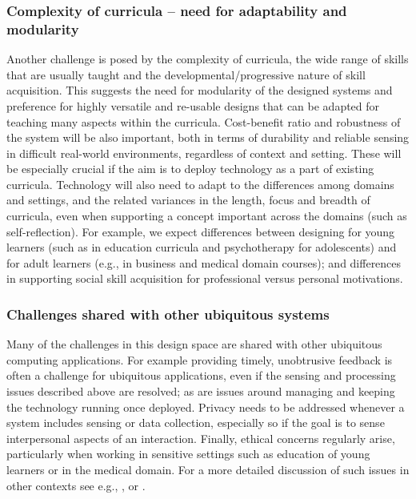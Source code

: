 \documentclass[prodmode,acmtochi]{acmsmall}
\newcommand{\GeraldineTODO}[1]{}
\newcommand{\rephrase}[1]{\textrm{\textrm{\textcolor{gray}{#1}}}}
\begin{document}
\subsubsection{Complexity of curricula -- need for adaptability and modularity}
Another challenge is posed by the complexity of curricula, the wide range of skills that are usually taught and the developmental/progressive nature of skill acquisition. This suggests the need for modularity of the designed systems and preference for highly versatile and re-usable designs that can be adapted for teaching many aspects within the curricula. %
%
%
Cost-benefit ratio and robustness of the system will be also important, both in terms of durability and reliable sensing in difficult real-world environments, regardless of context and setting. These will be especially crucial if the aim is to deploy technology as a part of existing curricula. 
%
Technology will also need to adapt to the differences among domains and settings, and the related variances in the length, focus and breadth of curricula, even when supporting a concept important across the domains (such as self-reflection). For example, we expect differences between designing for young learners (such as in education curricula and psychotherapy for adolescents) and for adult learners (e.g., in business and medical domain courses); and differences in supporting social skill acquisition for professional versus personal motivations.

\GeraldineTODO{G: could reference here something from the PAL\ project   and their AIRS platform and/or the MyRoR platform as technical architectures specifically aiming to support such adaptive modularity    }

\subsubsection{Challenges shared with other ubiquitous systems} Many of the challenges in this design space are shared with other ubiquitous computing applications. For example  providing timely, unobtrusive feedback is often a challenge for ubiquitous applications, even if the sensing and processing issues described above are resolved; as are issues around managing and keeping the technology running once deployed. Privacy needs to be addressed whenever a system includes sensing or data collection,  especially so if the goal is to sense interpersonal aspects of an interaction. Finally, ethical concerns regularly arise, particularly when working in sensitive settings such as education of young learners or in the medical domain. 
For a more detailed discussion of such issues in other contexts see e.g., ,  or .
\end{document}
